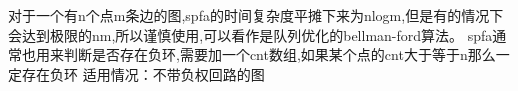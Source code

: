 对于一个有n个点m条边的图,spfa的时间复杂度平摊下来为nlogm,但是有的情况下会达到极限的nm,所以谨慎使用,可以看作是队列优化的bellman-ford算法。
spfa通常也用来判断是否存在负环,需要加一个cnt数组,如果某个点的cnt大于等于n那么一定存在负环
适用情况：不带负权回路的图